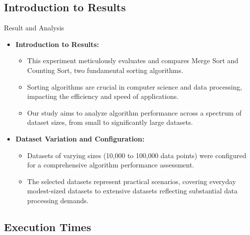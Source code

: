 \documentclass{beamer}
\begin{document}
\subsection{Introduction to Results}
\begin{frame}{Result and Analysis}
	\begin{itemize}
		
		\item \textbf{Introduction to Results:}
		\begin{itemize}
			\item This experiment meticulously evaluates and compares Merge Sort and Counting Sort, two fundamental sorting algorithms.
			\item Sorting algorithms are crucial in computer science and data processing, impacting the efficiency and speed of applications.
			\item Our study aims to analyze algorithm performance across a spectrum of dataset sizes, from small to significantly large datasets. \cite{Wikipedia}
		\end{itemize}
		
		\item \textbf{Dataset Variation and Configuration:}
		\begin{itemize}
			\item Datasets of varying sizes (10,000 to 100,000 data points) were configured for a comprehensive algorithm performance assessment.
			\item The selected datasets represent practical scenarios, covering everyday modest-sized datasets to extensive datasets reflecting substantial data processing demands.
		\end{itemize}
	\end{itemize}
	
\end{frame}

\subsection{Execution Times}
\end{document}
